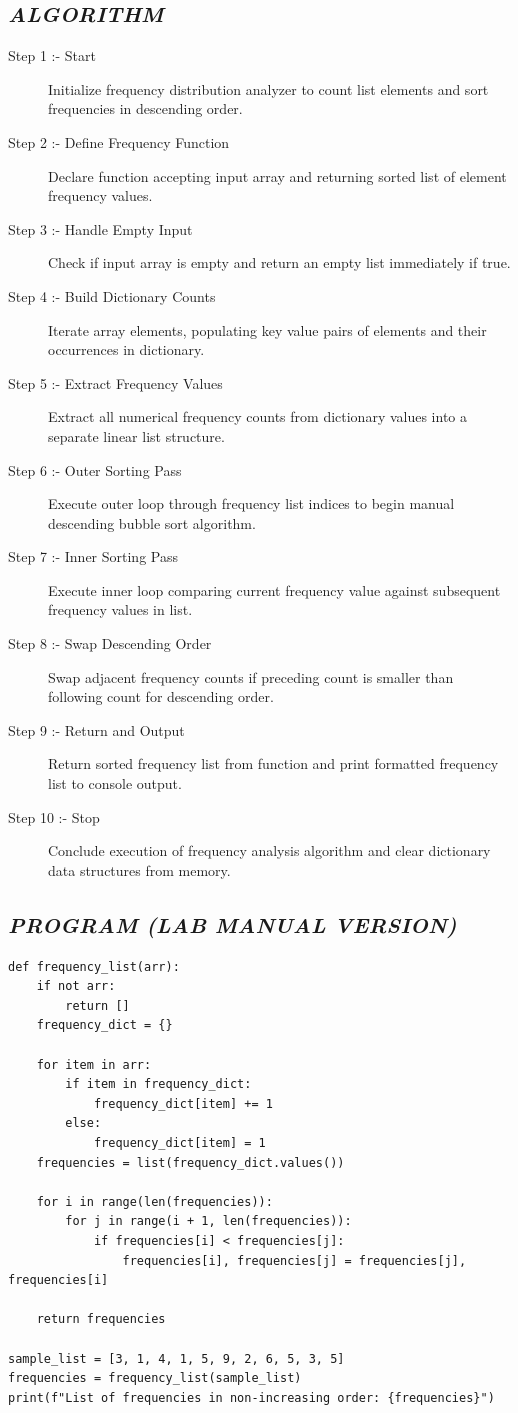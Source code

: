 \documentclass[11pt,a4paper]{article}
\begin{document}
\subsection*{\textit{ALGORITHM}}
\begin{description}
  \item[Step 1 :- Start] Initialize frequency distribution analyzer to count list elements and sort frequencies in descending order.
  \item[Step 2 :- Define Frequency Function] Declare function accepting input array and returning sorted list of element frequency values.
  \item[Step 3 :- Handle Empty Input] Check if input array is empty and return an empty list immediately if true.
  \item[Step 4 :- Build Dictionary Counts] Iterate array elements, populating key value pairs of elements and their occurrences in dictionary.
  \item[Step 5 :- Extract Frequency Values] Extract all numerical frequency counts from dictionary values into a separate linear list structure.
  \item[Step 6 :- Outer Sorting Pass] Execute outer loop through frequency list indices to begin manual descending bubble sort algorithm.
  \item[Step 7 :- Inner Sorting Pass] Execute inner loop comparing current frequency value against subsequent frequency values in list.
  \item[Step 8 :- Swap Descending Order] Swap adjacent frequency counts if preceding count is smaller than following count for descending order.
  \item[Step 9 :- Return and Output] Return sorted frequency list from function and print formatted frequency list to console output.
  \item[Step 10 :- Stop] Conclude execution of frequency analysis algorithm and clear dictionary data structures from memory.
\end{description}

\subsection*{\textit{PROGRAM (LAB MANUAL VERSION)}}
\begin{lstlisting}[style=pythonstyle]
def frequency_list(arr): 
    if not arr:  
        return [] 
    frequency_dict = {} 
 
    for item in arr: 
        if item in frequency_dict: 
            frequency_dict[item] += 1 
        else: 
            frequency_dict[item] = 1 
    frequencies = list(frequency_dict.values()) 
 
    for i in range(len(frequencies)): 
        for j in range(i + 1, len(frequencies)): 
            if frequencies[i] < frequencies[j]: 
                frequencies[i], frequencies[j] = frequencies[j], frequencies[i] 
 
    return frequencies 

sample_list = [3, 1, 4, 1, 5, 9, 2, 6, 5, 3, 5] 
frequencies = frequency_list(sample_list) 
print(f"List of frequencies in non-increasing order: {frequencies}")
\end{lstlisting}
\end{document}
